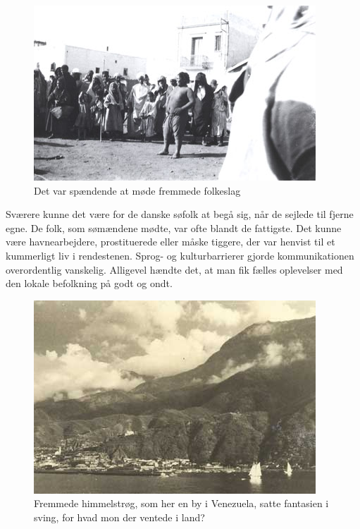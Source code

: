 \begin{figure}
\centering
\includegraphics{images/sejlskibe_tema-7-fremmede.jpg}
\caption{Det var spændende at møde fremmede folkeslag}
\end{figure}

Sværere kunne det være for de danske søfolk at begå sig, når de sejlede
til fjerne egne. De folk, som sømændene mødte, var ofte blandt de
fattigste. Det kunne være havnearbejdere, prostituerede eller måske
tiggere, der var henvist til et kummerligt liv i rendestenen. Sprog- og
kulturbarrierer gjorde kommunikationen overordentlig vanskelig.
Alligevel hændte det, at man fik fælles oplevelser med den lokale
befolkning på godt og ondt.

\begin{figure}
\centering
\includegraphics{images/sejlskibe_tema-7-venezuela.jpg}
\caption{Fremmede himmelstrøg, som her en by i Venezuela, satte
fantasien i sving, for hvad mon der ventede i land?}
\end{figure}

